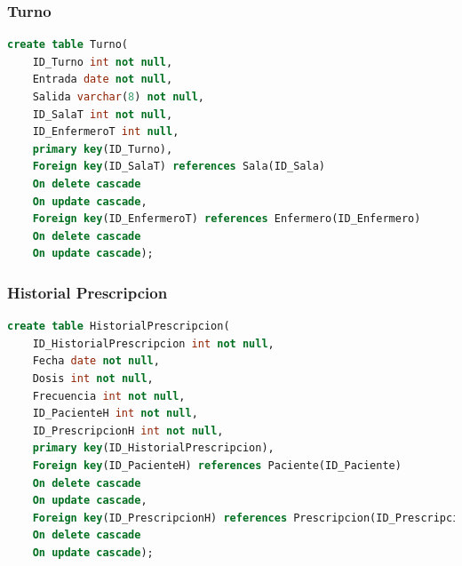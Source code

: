 \documentclass[10pt,letterpaper]{book}
\begin{document}
\subsubsection{Turno}
\begin{lstlisting}[language=sql]
create table Turno(
	ID_Turno int not null,
	Entrada date not null,
	Salida varchar(8) not null,
	ID_SalaT int not null,
	ID_EnfermeroT int null,
	primary key(ID_Turno),
	Foreign key(ID_SalaT) references Sala(ID_Sala)
	On delete cascade
	On update cascade,
	Foreign key(ID_EnfermeroT) references Enfermero(ID_Enfermero)
	On delete cascade
	On update cascade);
\end{lstlisting}
\pagebreak
\subsubsection{Historial Prescripcion}
\begin{lstlisting}[language=sql]
create table HistorialPrescripcion(
	ID_HistorialPrescripcion int not null,
	Fecha date not null,
	Dosis int not null,
	Frecuencia int not null,
	ID_PacienteH int not null,
	ID_PrescripcionH int not null,
	primary key(ID_HistorialPrescripcion),
	Foreign key(ID_PacienteH) references Paciente(ID_Paciente)
	On delete cascade
	On update cascade,
	Foreign key(ID_PrescripcionH) references Prescripcion(ID_Prescripcion)
	On delete cascade
	On update cascade);
\end{lstlisting}
\end{document}
